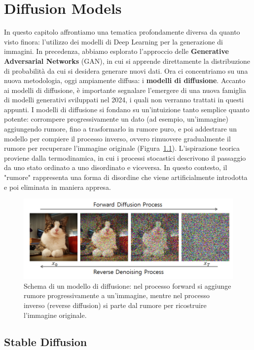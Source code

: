 \chapter{Diffusion Models}\label{cap:15}

In questo capitolo affrontiamo una tematica profondamente diversa da quanto visto finora: l’utilizzo dei modelli di Deep Learning per la generazione di immagini. In precedenza, abbiamo esplorato l'approccio delle \textbf{Generative Adversarial Networks} (GAN), in cui si apprende direttamente la distribuzione di probabilità da cui si desidera generare nuovi dati. Ora ci concentriamo su una nuova metodologia, oggi ampiamente diffusa: i \textbf{modelli di diffusione}. Accanto ai modelli di diffusione, è importante segnalare l’emergere di una nuova famiglia di modelli generativi sviluppati nel 2024, i quali non verranno trattati in questi appunti. I modelli di diffusione si fondano su un'intuizione tanto semplice quanto potente: corrompere progressivamente un dato (ad esempio, un'immagine) aggiungendo rumore, fino a trasformarlo in rumore puro, e poi addestrare un modello per compiere il processo inverso, ovvero rimuovere gradualmente il rumore per recuperare l’immagine originale (Figura~\ref{fig:diffMod}). L’ispirazione teorica proviene dalla termodinamica, in cui i processi stocastici descrivono il passaggio da uno stato ordinato a uno disordinato e viceversa. In questo contesto, il "rumore" rappresenta una forma di disordine che viene artificialmente introdotta e poi eliminata in maniera appresa.

\begin{figure}
    \centering
    \includegraphics[width=\textwidth]{figure/diffusionModel}
    \caption{Schema di un modello di diffusione: nel processo forward si aggiunge rumore progressivamente a un’immagine, mentre nel processo inverso (reverse diffusion) si parte dal rumore per ricostruire l’immagine originale.}
    \label{fig:diffMod}
\end{figure}

\section{Stable Diffusion}

